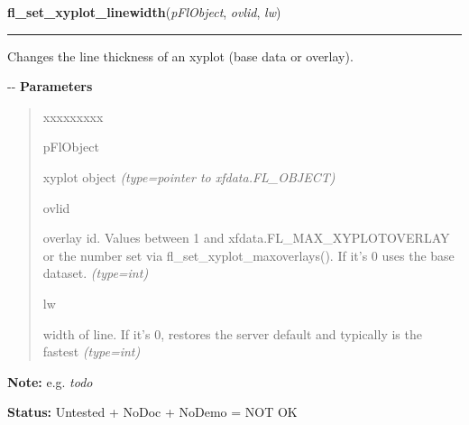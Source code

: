 \hspace{.8\funcindent}\begin{boxedminipage}{\funcwidth}

    \raggedright \textbf{fl\_set\_xyplot\_linewidth}(\textit{pFlObject}, \textit{ovlid}, \textit{lw})

    \vspace{-1.5ex}

    \rule{\textwidth}{0.5\fboxrule}
\setlength{\parskip}{2ex}

Changes the line thickness of an xyplot (base data or overlay).

-{}-
\setlength{\parskip}{1ex}
      \textbf{Parameters}
      \vspace{-1ex}

      \begin{quote}
        \begin{Ventry}{xxxxxxxxx}

          \item[pFlObject]


xyplot object
            {\it (type=pointer to xfdata.FL\_OBJECT)}

          \item[ovlid]


overlay id. Values between 1 and xfdata.FL\_MAX\_XYPLOTOVERLAY or the
number set via fl\_set\_xyplot\_maxoverlays(). If it's 0 uses the base
dataset.
            {\it (type=int)}

          \item[lw]


width of line. If it's 0, restores the server default and typically
is the fastest
            {\it (type=int)}

        \end{Ventry}

      \end{quote}

\textbf{Note:} 
e.g. \emph{todo}


\textbf{Status:} 
Untested + NoDoc + NoDemo = NOT OK


    \end{boxedminipage}

    \label{xformslib:flxyplot:fl_set_xyplot_xgrid}

    \vspace{0.5ex}

